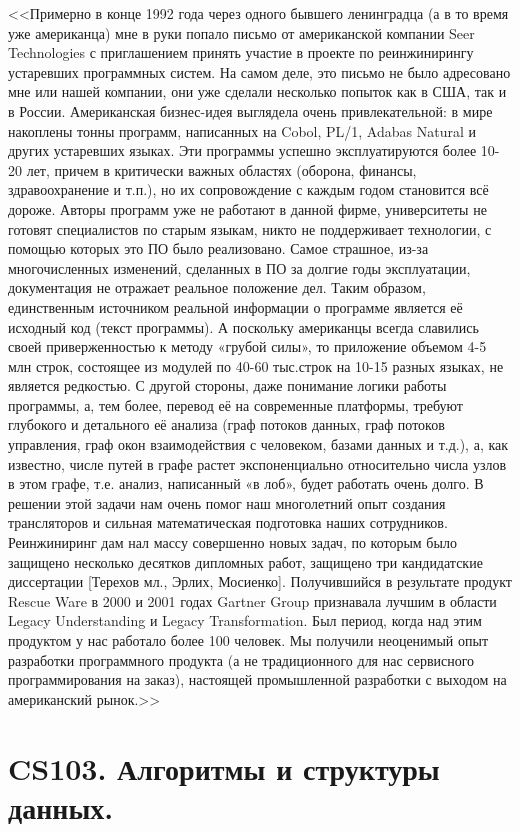 \documentclass[12pt, a4paper]{article}
\begin{document}
<<Примерно в конце 1992 года через одного бывшего ленинградца (а в то время уже
американца) мне в руки попало письмо от американской компании Seer Technologies с
приглашением принять участие в проекте по реинжинирингу устаревших программных
систем. На самом деле, это письмо не было адресовано мне или нашей компании, они уже
сделали несколько попыток как в США, так и в России. Американская бизнес-идея
выглядела очень привлекательной: в мире накоплены тонны программ, написанных на
Cobol, PL/1, Adabas Natural и других устаревших языках. Эти программы успешно
эксплуатируются более 10-20 лет, причем в критически важных областях (оборона,
финансы, здравоохранение и т.п.), но их сопровождение с каждым годом становится всё
дороже. Авторы программ уже не работают в данной фирме, университеты не готовят
специалистов по старым языкам, никто не поддерживает технологии, с помощью которых
это ПО было реализовано. Самое страшное, из-за многочисленных изменений, сделанных 
в ПО за долгие годы эксплуатации, документация не отражает реальное положение дел.
Таким образом, единственным источником реальной информации о программе является её
исходный код (текст программы). А поскольку американцы всегда славились своей
приверженностью к методу «грубой силы», то приложение объемом 4-5 млн строк,
состоящее из модулей по 40-60 тыс.строк на 10-15 разных языках, не является редкостью.
С другой стороны, даже понимание логики работы программы, а, тем более,
перевод её на современные платформы, требуют глубокого и детального её анализа (граф
потоков данных, граф потоков управления, граф окон взаимодействия с человеком, базами
данных и т.д.), а, как известно, числе путей в графе растет экспоненциально относительно
числа узлов в этом графе, т.е. анализ, написанный «в лоб», будет работать очень долго.
В решении этой задачи нам очень помог наш многолетний опыт создания
трансляторов и сильная математическая подготовка наших сотрудников. Реинжиниринг
дам нал массу совершенно новых задач, по которым было защищено несколько десятков
дипломных работ, защищено три кандидатские диссертации [Терехов мл., Эрлих,
Мосиенко].
Получившийся в результате продукт Rescue Ware в 2000 и 2001 годах Gartner Group
признавала лучшим в области Legacy Understanding и Legacy Transformation. Был период,
когда над этим продуктом у нас работало более 100 человек. Мы получили неоценимый
опыт разработки программного продукта (а не традиционного для нас сервисного
программирования на заказ), настоящей промышленной разработки с выходом на
американский рынок.>>

\section{CS103. Алгоритмы и структуры данных.}
\end{document}
